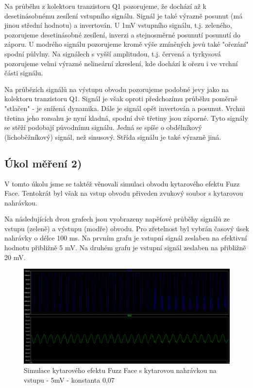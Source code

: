 \documentclass[a4paper, czech]{article}
\begin{document}
Na průběhu z kolektoru tranzistoru Q1 pozorujeme, že dochází až k desetinásobnému zesílení vstupního signálu.
Signál je také výrazně posunut (má jinou střední hodnotu) a invertován.
U 1mV vstupního signálu, t.j. zeleného, pozorujeme desetinásobné zesílení, inverzi a stejnosměrné posunutí posunutí do záporu.
U modrého signálu pozorujeme kromě výše zmíněných jevů také "ořezání" spodní půlvlny.
Na signálech s vyšší amplitudou, t.j. červená a tyrkysová pozorujeme velmi výrazné nelineární zkreslení, kde dochází k ořezu i ve vrchní části signálu.

Na průbězích signálů na výstupu obvodu pozorujeme podobné jevy jako na kolektoru tranzistoru Q1.
Signál je však oproti předchozímu průběhu poměrně "stlačen" - je snížená dynamika.
Dále je signál opět invertován a posunut.
Vrchni třetina jeho rozsahu je nyní kladná, spodní dvě třetiny jsou záporné.
Tyto signály se stěží podobají původnímu signálu.
Jedná se spíše o obdélníkový (lichoběžníkový) signál, než sinusový.
Střída signálu je také výrazně jiná.

\subsection{Úkol měření 2)}

V tomto úkolu jsme se taktéž věnovali simulaci obvodu kytarového efektu Fuzz Face.
Tentokrát byl však na vstup obvodu přiveden zvukový soubor s kytarovou nahrávkou.

Na následujících dvou grafech jsou vyobrazeny napěťové průběhy signálů ze vstupu (zeleně) a výstupu (modře) obvodu.
Pro zřetelnost byl vybrán časový úsek nahrávky o délce 100 ms.
Na prvním grafu je vstupní signál zeslaben na efektivní hodnotu přibližně 5 mV.
Na druhém grafu je vstupní signál zeslaben na přibližně 20 mV.

\begin{figure}[H]
    \centering
    \includegraphics[width=\linewidth]{2_fuzz_face_zvuk_5mV.png}
    \caption{Simulace kytarového efektu Fuzz Face s kytarovou nahrávkou na vstupu - 5mV - konstanta 0,07}
\end{figure}
\end{document}
